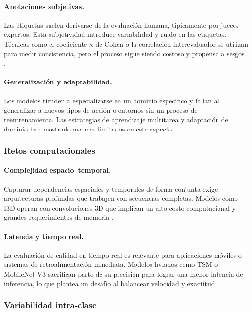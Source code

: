 \paragraph{Anotaciones subjetivas.}
Las etiquetas suelen derivarse de la evaluación humana, típicamente por jueces expertos. Esta subjetividad introduce variabilidad y ruido en las etiquetas. Técnicas como el coeficiente $\kappa$ de Cohen o la correlación interevaluador se utilizan para medir consistencia, pero el proceso sigue siendo costoso y propenso a sesgos \cite{Li2019ActionEval}.

\paragraph{Generalización y adaptabilidad.}
Los modelos tienden a especializarse en un dominio específico y fallan al generalizar a nuevos tipos de acción o entornos sin un proceso de reentrenamiento. Las estrategias de aprendizaje multitarea y adaptación de dominio han mostrado avances limitados en este aspecto \cite{Parmar2019MTLAQA}.

\subsubsection{Retos computacionales}

\paragraph{Complejidad espacio–temporal.}
Capturar dependencias espaciales y temporales de forma conjunta exige arquitecturas profundas que trabajen con secuencias completas. Modelos como \ac{I3D} operan con convoluciones 3D que implican un alto costo computacional y grandes requerimientos de memoria \cite{Carreira2017I3D}.

\paragraph{Latencia y tiempo real.}
La evaluación de calidad en tiempo real es relevante para aplicaciones móviles o sistemas de retroalimentación inmediata. Modelos livianos como \ac{TSM} o MobileNet-V3 sacrifican parte de su precisión para lograr una menor latencia de inferencia, lo que plantea un desafío al balancear velocidad y exactitud \cite{Howard2019MobileNetV3,Wang2024Review}.

\subsubsection{Variabilidad intra‐clase}

